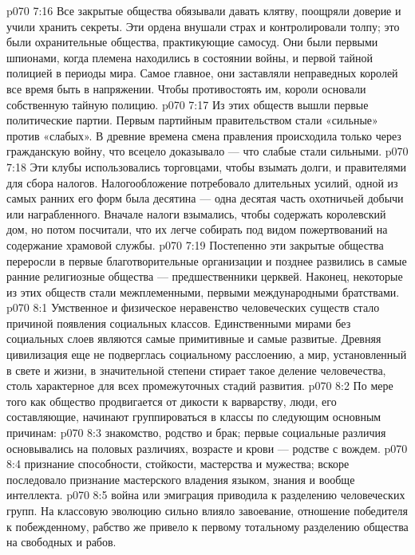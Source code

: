 \vs p070 7:16 Все закрытые общества обязывали давать клятву, поощряли доверие и учили хранить секреты. Эти ордена внушали страх и контролировали толпу; это были охранительные общества, практикующие самосуд. Они были первыми шпионами, когда племена находились в состоянии войны, и первой тайной полицией в периоды мира. Самое главное, они заставляли неправедных королей все время быть в напряжении. Чтобы противостоять им, короли основали собственную тайную полицию.
\vs p070 7:17 Из этих обществ вышли первые политические партии. Первым партийным правительством стали «сильные» против «слабых». В древние времена смена правления происходила только через гражданскую войну, что всецело доказывало --- что слабые стали сильными.
\vs p070 7:18 Эти клубы использовались торговцами, чтобы взымать долги, и правителями для сбора налогов. Налогообложение потребовало длительных усилий, одной из самых ранних его форм была десятина --- одна десятая часть охотничьей добычи или награбленного. Вначале налоги взымались, чтобы содержать королевский дом, но потом посчитали, что их легче собирать под видом пожертвований на содержание храмовой службы.
\vs p070 7:19 Постепенно эти закрытые общества переросли в первые благотворительные организации и позднее развились в самые ранние религиозные общества --- предшественники церквей. Наконец, некоторые из этих обществ стали межплеменными, первыми международными братствами.
\vs p070 8:1 Умственное и физическое неравенство человеческих существ стало причиной появления социальных классов. Единственными мирами без социальных слоев являются самые примитивные и самые развитые. Древняя цивилизация еще не подверглась социальному расслоению, а мир, установленный в свете и жизни, в значительной степени стирает такое деление человечества, столь характерное для всех промежуточных стадий развития.
\vs p070 8:2 По мере того как общество продвигается от дикости к варварству, люди, его составляющие, начинают группироваться в классы по следующим основным причинам:
\vs p070 8:3 \bibnobreakspace {} знакомство, родство и брак; первые социальные различия основывались на половых различиях, возрасте и крови --- родстве с вождем.
\vs p070 8:4 \pc {}\bibnobreakspace {} признание способности, стойкости, мастерства и мужества; вскоре последовало признание мастерского владения языком, знания и вообще интеллекта.
\vs p070 8:5 \pc {}\bibnobreakspace {} война или эмиграция приводила к разделению человеческих групп. На классовую эволюцию сильно влияло завоевание, отношение победителя к побежденному, рабство же привело к первому тотальному разделению общества на свободных и рабов.
